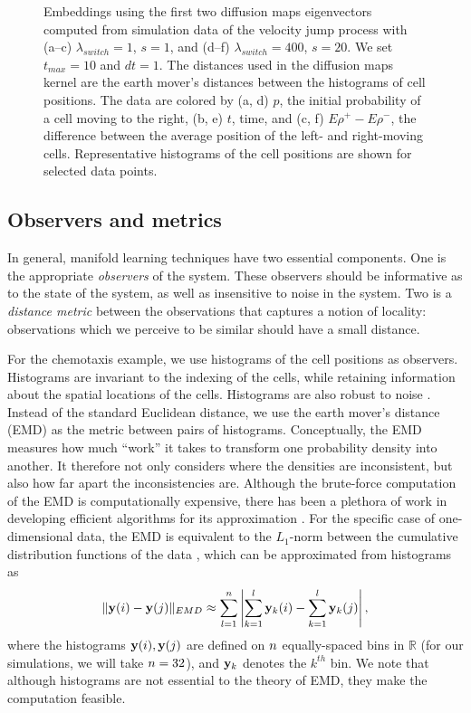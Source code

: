 \begin{figure}[t!]
\begin{subfigure}{\figwidth}
\caption{}
\label{subfig:large_lambda_rho}
\end{subfigure}
\caption[Diffusion maps embeddings of chemotaxis simulation data]{Embeddings using the first two diffusion maps eigenvectors computed from simulation data of the velocity jump process with (a--c) $\lambda_{switch}=1$, $s=1$, and (d--f) $\lambda_{switch}=400$, $s=20$.  We set $t_{max} = 10$ and $dt=1$. The distances used in the diffusion maps kernel are the earth mover's distances between the histograms of cell positions. The data are colored by (a, d) $p$, the initial probability of a cell moving to the right, (b, e) $t$, time, and (c, f) $E \rho^+ - E \rho^-$, the difference between the average position of the left- and right-moving cells. Representative histograms of the cell positions are shown for selected data points. }
\label{fig:dmaps_embed_emd}
\end{figure}

\subsection{Observers and metrics}

In general, manifold learning techniques have two essential components.
%
One is the appropriate {\em observers} of the system.
%
These observers should be informative as to the state of the system, as well as insensitive to noise in the system.
%
Two is a {\em distance metric} between the observations that captures a notion of locality: observations which we perceive to be similar should have a small distance.

For the chemotaxis example, we use histograms of the cell positions as observers.
%
Histograms are invariant to the indexing of the cells, while retaining information about the spatial locations of the cells.
%
Histograms are also robust to noise \cite{talmon2013empirical}.
%
Instead of the standard Euclidean distance, we use the earth mover's distance (EMD) \cite{rubner2000earth} as the metric between pairs of histograms.
%
Conceptually, the EMD measures how much ``work'' it takes to transform one probability density into another.
%
It therefore not only considers where the densities are inconsistent, but also how far apart the inconsistencies are.
%
Although the brute-force computation of the EMD is computationally expensive, there has been a plethora of work in developing efficient algorithms for its approximation \cite{Pele-eccv2008, Pele-iccv2009}.
%
For the specific case of one-dimensional data, the EMD is equivalent to the $L_1$-norm between the cumulative distribution functions of the data \cite{rubner2000perceptual}, which can be approximated from histograms as
\begin{equation}
\| \mathbf{y}(i) - \mathbf{y}(j) \|_{EMD} \approx \sum_{l=1}^{n} \left| \sum_{k=1}^l \mathbf{y}_k(i) - \sum_{k=1}^l \mathbf{y}_k(j) \right|,
\end{equation}
where the histograms $\mathbf{y}(i), \mathbf{y}(j)$ are defined on $n$ equally-spaced bins in $\mathbb{R}$ (for our simulations, we will take $n=32$), and $\mathbf{y}_k$ denotes the $k^{th}$ bin.
%
We note that although histograms are not essential to the theory of EMD, they make the computation feasible.


